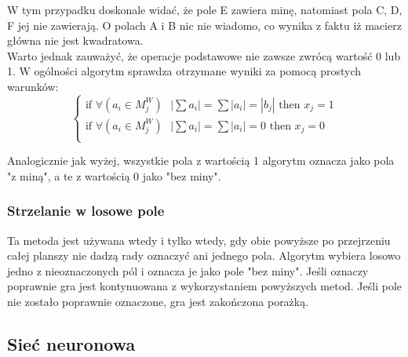 \documentclass[letterpaper,12pt]{article} %
\begin{document}
W tym przypadku doskonale widać, że pole E zawiera minę, natomiast pola C, D, F jej nie zawierają. 
O polach A i B nic nie wiadomo, co wynika z faktu iż macierz główna nie jest kwadratowa. \\
Warto jednak zauważyć, że operacje podstawowe nie zawsze zwrócą wartość 0 lub 1. W ogólności
algorytm sprawdza otrzymane wyniki za pomocą prostych warunków: 
$$
\begin{cases}
 \text{if } \forall{(a_{i} \in M_{j}^W)} \text{ } |\sum{a_{i}}| = \sum{|a_{i}| = |b_{j}|}  \text{ then } x_{j}=1 \\
 \text{if } \forall{(a_{i} \in M_{j}^W)} \text{ } |\sum{a_{i}}| = \sum{|a_{i}|} = 0 \text{ then } x_{j}=0 \\
\end{cases}
$$

Analogicznie jak wyżej, wszystkie pola z wartością 1 algorytm oznacza jako pola "z miną", a te z wartością 0 jako "bez miny".

\subsubsection*{Strzelanie w losowe pole}
Ta metoda jest używana wtedy i tylko wtedy, gdy obie powyższe po przejrzeniu całej planszy
nie dadzą rady oznaczyć ani jednego pola. Algorytm wybiera losowo jedno z nieoznaczonych pól
i oznacza je jako pole "bez miny". Jeśli oznaczy poprawnie gra jest kontynuowana z wykorzystaniem
 powyższych metod. Jeśli pole nie zostało poprawnie oznaczone, gra jest zakończona porażką.

\subsection{Sieć neuronowa}
\end{document}
